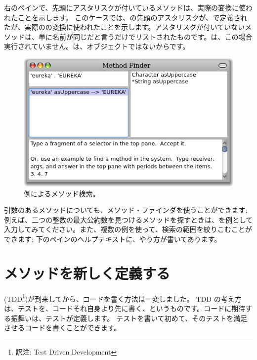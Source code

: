\documentclass[a4paper,10pt,twoside]{book}
\begin{document}
右のペインで、先頭にアスタリスクが付いているメソッドは、実際の変換に使われたことを示します。
このケースでは、の先頭のアスタリスクが、で定義されたが、実際のの変換に使われたことを示します。アスタリスクが付いていないメソッドは、単に名前が同じだと言うだけでリストされたものです。は、この場合実行されていません。は、オブジェクトではないからです。

\begin{figure}[hbt]
\centerline {\includegraphics[width=\textwidth]{MethodFinder-example1}}
\caption{例によるメソッド検索。
}
\end{figure}

引数のあるメソッドについても、メソッド・ファインダを使うことができます; 例えば、二つの整数の最大公約数を見つけるメソッドを探すときは、を例として入力してみてください。また、複数の例を使って、検索の範囲を絞りこむことができます; 下のペインのヘルプテキストに、やり方が書いてあります。

\section{メソッドを新しく定義する}

\cite{Beck03a} (TDD\footnote{訳注: Test Driven Development})が到来してから、コードを書く方法は一変しました。
TDD の考え方は、テストを、コードそれ自身より先に書く、というものです。コードに期待する振舞いは、テストが定義します。
テストを書いて初めて、そのテストを満足させるコードを書くことができます。
\end{document}
